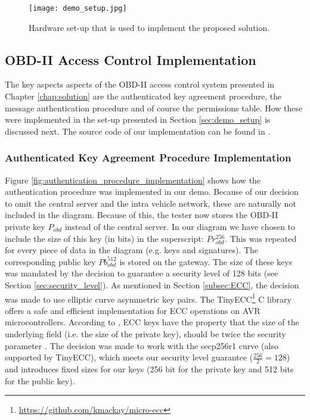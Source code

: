 \begin{figure}[h]
	\centering
	\texttt{[image: demo\_setup.jpg]}
	\label{fig:demo}
	\caption{Hardware set-up that is used to implement the proposed solution.}
\end{figure}

\subsection{OBD-II Access Control Implementation}
The key aspects aspects of the OBD-II access control system presented in Chapter \ref{chap:solution} are the authenticated key agreement procedure, the message authentication procedure and of course the permissions table. How these were implemented in the set-up presented in Section \ref{sec:demo_setup} is discussed next. The source code of our implementation can be found in \cite{Michel}.  

\subsubsection{Authenticated Key Agreement Procedure Implementation}
\label{subsec:authenticated_key_agreement_procedure_implementation}

Figure \ref{fig:authentication_procedure_implementation} shows how the authentication procedure was implemented in our demo. Because of our decision to omit the central server and the intra vehicle network, these are naturally not included in the diagram. Because of this, the tester now stores the OBD-II private key $P_{obd}$ instead of the central server. In our diagram we have chosen to include the size of this key (in bits) in the superscript: $Pr_{obd}^{256}$. This was repeated for every piece of data in the diagram (e.g. keys and signatures). The corresponding public key $Pb_{obd}^{512}$ is stored on the gateway. The size of these keys was mandated by the decision to guarantee a security level of 128 bits (see Section \ref{sec:security_level}). As mentioned in Section \ref{subsec:ECC}, the decision was made to use elliptic curve asymmetric key pairs. The TinyECC\footnote{\url{https://github.com/kmackay/micro-ecc}} C library offers a safe and efficient implementation for ECC operations on AVR microcontrollers. According to \cite{Siddiqui}, ECC keys have the property that the size of the underlying field (i.e. the size of the private key), should be twice the security parameter \cite{Siddiqui}. The decision was made to work with the secp256r1 curve (also supported by TinyECC), which meets our security level guarantee ($\frac{256}{2}=128$) and introduces fixed sizes for our keys (256 bit for the private key and 512 bits for the public key).

